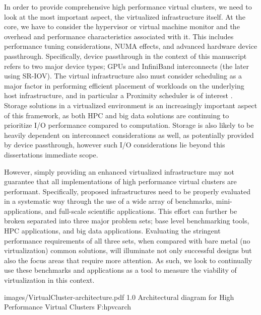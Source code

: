 In order to provide comprehensive high performance virtual clusters, we need to look at the most important aspect, the virtualized infrastructure itself. At the core, we have to consider the hypervisor or virtual machine monitor and the overhead and performance characteristics associated with it. This includes performance tuning considerations, NUMA effects, and advanced hardware device passthrough. Specifically, device passthrough in the context of this manuscript refers to two major device types; GPUs and InfiniBand interconnects (the later using SR-IOV). The virtual infrastructure also must consider scheduling as a major factor in performing efficient placement of workloads on the underlying host infrastructure, and in particular a Proximity scheduler is of interest \cite{www-proximity-scheduler}. Storage solutions in a virtualized environment is an increasingly important aspect of this framework, as both HPC and big data solutions are continuing to prioritize I/O performance compared to computation. Storage is also likely to be heavily dependent on interconnect considerations as well, as potentially provided by device passthrough, however such I/O considerations lie beyond this dissertations immediate scope.  

However, simply providing an enhanced virtualized infrastructure may not guarantee that all implementations of high performance virtual clusters are performant. Specifically, proposed infrastructures need to be properly evaluated in a systematic way through the use of a wide array of benchmarks, mini-applications, and full-scale scientific applications. This effort can further be broken separated into three major problem sets; base level benchmarking tools, HPC applications, and big data applications. Evaluating the stringent performance requirements of all three sets, when compared with bare metal (no virtualization) common solutions, will illuminate not only successful designs but also the focus areas that require more attention.  As such, we look to continually use these benchmarks and applications as a tool to measure the viability of virtualization in this context. 

  {images/VirtualCluster-architecture.pdf}
  {1.0}
  {Architectural diagram for High Performance Virtual Clusters}
  {F:hpvcarch}

